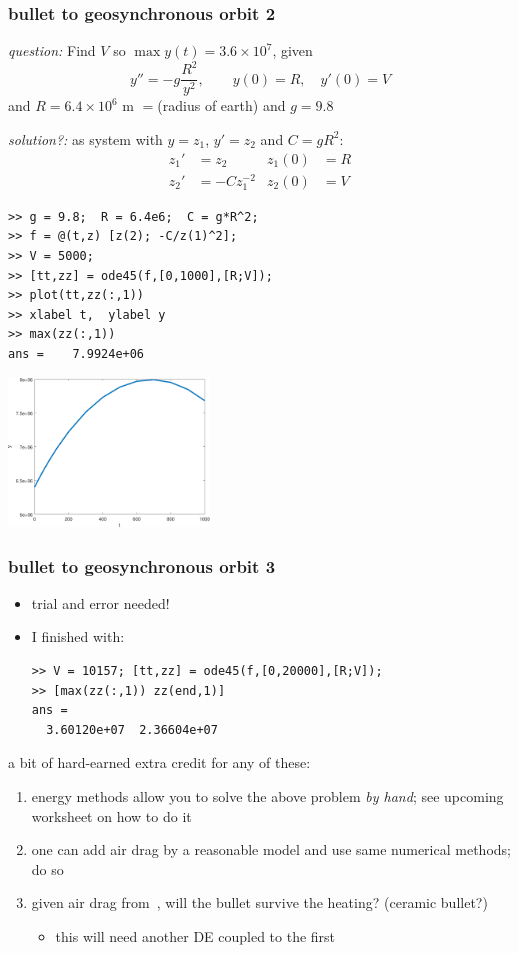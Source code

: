 \documentclass[dvipsnames,colorlinks]{beamer}
\newcommand\enumnum[1]{{\renewcommand{\insertenumlabel}{#1}%
      \usebeamertemplate{enumerate item} \,}}
\begin{document}
\begin{frame}[fragile]
\frametitle{bullet to geosynchronous orbit 2}

\small

\emph{question:} Find $V$ so $\max y(t) = 3.6\times 10^7$, given
    $$y'' = -g \frac{R^2}{y^2}, \qquad y(0)=R, \quad y'(0)=V$$
and $R=6.4\times 10^6$ m $=$(radius of earth) and $g=9.8$

\emph{solution?:} as system with $y=z_1$, $y'=z_2$ and $C=gR^2$:
\begin{align*}
z_1' &= z_2  & z_1(0)&=R \\
z_2' &= - C z_1^{-2} & z_2(0) &= V
\end{align*}

\begin{Verbatim}[fontsize=\footnotesize]
>> g = 9.8;  R = 6.4e6;  C = g*R^2;
>> f = @(t,z) [z(2); -C/z(1)^2];
>> V = 5000;
>> [tt,zz] = ode45(f,[0,1000],[R;V]);
>> plot(tt,zz(:,1))
>> xlabel t,  ylabel y
>> max(zz(:,1))
ans =    7.9924e+06
\end{Verbatim}

\vspace{-30mm}

\hfill \includegraphics[width=0.4\textwidth]{figs/firstbullet}
\end{frame}


\begin{frame}[fragile]
\frametitle{bullet to geosynchronous orbit 3}

\begin{itemize}
\item trial and error needed!
\item I finished with:
\begin{Verbatim}[fontsize=\footnotesize]
>> V = 10157; [tt,zz] = ode45(f,[0,20000],[R;V]);
>> [max(zz(:,1)) zz(end,1)]
ans =
  3.60120e+07  2.36604e+07
\end{Verbatim}
\end{itemize}

\bigskip
\small
a bit of hard-earned \alert{extra credit} for any of these:
\begin{enumerate}
\item energy methods allow you to solve the above problem \emph{by hand}; see upcoming worksheet on how to do it
\item one can add air drag by a reasonable model and use same numerical methods; do so
\item given air drag from \enumnum{2}, will the bullet survive the heating? (ceramic bullet?)
    \begin{itemize}
    \item this will need another DE coupled to the first
    \end{itemize}
\end{enumerate}
\end{frame}
\end{document}
